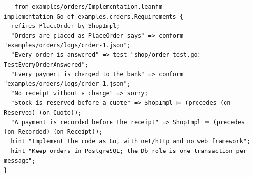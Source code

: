 \begin{lstlisting}[language={},basicstyle=\ttfamily\footnotesize,breaklines=true]
-- from examples/orders/Implementation.leanfm
implementation Go of examples.orders.Requirements {
  refines PlaceOrder by ShopImpl;
  "Orders are placed as PlaceOrder says" => conform "examples/orders/logs/order-1.json";
  "Every order is answered" => test "shop/order_test.go: TestEveryOrderAnswered";
  "Every payment is charged to the bank" => conform "examples/orders/logs/order-1.json";
  "No receipt without a charge" => sorry;
  "Stock is reserved before a quote" => ShopImpl ⊨ (precedes (on Reserved) (on Quote));
  "A payment is recorded before the receipt" => ShopImpl ⊨ (precedes (on Recorded) (on Receipt));
  hint "Implement the code as Go, with net/http and no web framework";
  hint "Keep orders in PostgreSQL; the Db role is one transaction per message";
}
\end{lstlisting}
